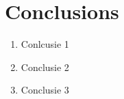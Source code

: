 \documentclass{aa}
\begin{document}
%
%


\section{Conclusions}

   \begin{enumerate}
      \item Conlcusie 1
      \item Conclusie 2
      \item Conclusie 3
   \end{enumerate}
\end{document}
